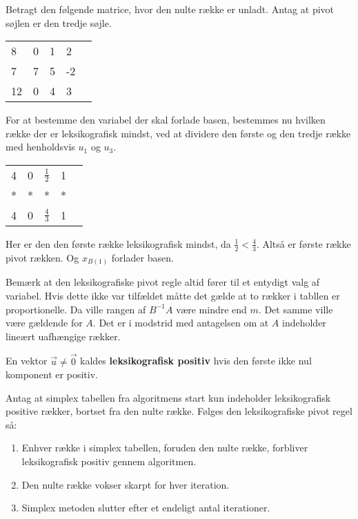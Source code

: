 \begin{eks}
Betragt den følgende matrice, hvor den nulte række er unladt. Antag at pivot søjlen er den tredje søjle. 

\begin{center}
\begin{tabular}{|l|llll|}
\hline
8  & 0 & 1 & 2  &  \\
7  & 7 & 5 & -2 &  \\
12 & 0 & 4 & 3  &  \\
\hline
\end{tabular}
\end{center}
For at bestemme den variabel der skal forlade basen, bestemmes nu hvilken række der er leksikografisk mindst, ved at dividere den første og den tredje række med henholdsvis $u_1$ og $u_3$.
\begin{center}
\begin{tabular}{|l|llll|}
\hline
4  & 0 & $\frac{1}{2}$ & 1  &  \\
*  & * & * & * &  \\
4 & 0 & $\frac{4}{3}$ & 1  &  \\
\hline
\end{tabular}
\end{center}
Her er den den første række leksikografisk mindst, da $\frac{1}{2}<\frac{4}{3}$.  Altså er første række pivot rækken. Og $x_{B(1)}$ forlader basen. 
\end{eks}

Bemærk at den leksikografiske pivot regle altid fører til et entydigt valg af variabel. Hvis dette ikke var tilfældet måtte det gælde at to rækker i tabllen er proportionelle. Da ville rangen af $B^{-1}A$ være mindre end $m$. Det samme ville være gældende for $A$. Det er i modstrid med antagelsen om at $A$ indeholder lineært uafhængige rækker. 

\begin{defn}
En vektor $\vec{u} \neq \vec{0}$ kaldes \textbf{leksikografisk positiv} hvis den første ikke nul komponent er positiv. 
\end{defn}

 
\begin{stn}
Antag at simplex tabellen fra algoritmens start kun indeholder leksikografisk positive rækker, bortset fra den nulte række. Følges den leksikografiske pivot regel så: 
\begin{enumerate}[label=(\alph*)]
\item Enhver række i simplex tabellen, foruden den nulte række, forbliver leksikografisk positiv gennem algoritmen. 
\item Den nulte række vokser skarpt for hver iteration. 
\item Simplex metoden slutter efter et endeligt antal iterationer. 
\end{enumerate}
\label{stn:lexi}
\end{stn}

